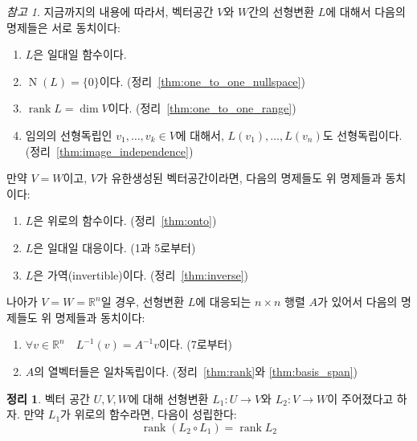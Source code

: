 \documentclass[unfonts,oneside,a4paper]{oblivoir}
\makeatletter
\theoremstyle{definition}
\theoremstyle{theorem}
\newtheorem{theorem}{정리}[section]
\theoremstyle{theorem}
\theoremstyle{remark}
\newtheorem*{remark}{참고}
\theoremstyle{remark}
\theoremstyle{remark}
\theoremstyle{remark}
\renewcommand{\vec}[1]{\bm{\mathit{#1}}}
\newcommand{\vecz}{\bm{\mathrm{0}}}
\DeclareMathOperator{\Null}{N}
\DeclareMathOperator{\rank}{rank}
\newcommand\nextitem[1]{%
    \setcounter{\@enumctr}{#1}%
    \addtocounter{\@enumctr}{-1}%
}
\makeatother
\begin{document}
\begin{remark} \label{page:equiv_remark}
    지금까지의 내용에 따라서, 벡터공간 $V$와 $W$간의 선형변환 $L$에 대해서 다음의 명제들은 서로 동치이다:
    \begin{enumerate}
        \item $L$은 일대일 함수이다.
        \item $\Null(L) = \{\vecz\}$이다. (정리~\ref{thm:one_to_one_nullspace})
        \item $\rank L = \dim V$이다. (정리~\ref{thm:one_to_one_range})
        \item 임의의 선형독립인 $\vec v_1, \dots, \vec v_k \in V$에 대해서, $L(\vec v_1), \dots, L(\vec v_n)$도 선형독립이다. (정리~\ref{thm:image_independence})
    \end{enumerate}

    만약 $V = W$이고, $V$가 유한생성된 벡터공간이라면, 다음의 명제들도 위 명제들과 동치이다:
    \begin{enumerate}
        \nextitem{5}
        \item $L$은 위로의 함수이다. (정리~\ref{thm:onto})
        \item $L$은 일대일 대응이다. (1과 5로부터)
        \item $L$은 가역(invertible)이다. (정리~\ref{thm:inverse})
    \end{enumerate}

    나아가 $V = W = \mathbb R^n$일 경우, 선형변환 $L$에 대응되는 $n \times n$ 행렬 $A$가 있어서 다음의 명제들도 위 명제들과 동치이다:
    \begin{enumerate}
        \nextitem{8}
        \item $\forall \vec v \in \mathbb R^n \quad L^{-1}(\vec v) = A^{-1} \vec v$이다. (7로부터)
        \item $A$의 열벡터들은 일차독립이다. (정리~\ref{thm:rank}와 \ref{thm:basis_span})
    \end{enumerate}
\end{remark}

\begin{theorem}
    벡터 공간 $U, V, W$에 대해 선형변환 $L_1: U \rightarrow V$와 $L_2: V \rightarrow W$이 주어졌다고 하자.
    만약 $L_1$가 위로의 함수라면, 다음이 성립한다:
    \begin{equation*}
        \rank (L_2 \circ L_1) = \rank L_2
    \end{equation*}
\end{theorem}
\end{document}
